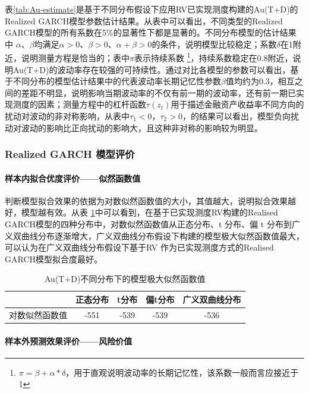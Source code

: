 \documentclass[UTF8,a4paper,12pt]{ctexart}  %
\begin{document}
表\ref{tab:Au-estimate}是基于不同分布假设下应用RV已实现测度构建的Au(T+D)的
Realized GARCH模型参数估计结果。从表中可以看出，不同类型的Realized GARCH模型的所有系数在5\%的显著性下都是显著的。不同分布模型的估计结果中
\(\alpha\)、\(\beta\)均满足\(\alpha>0\)、\(\beta>0\)、\(\alpha+\beta>0\)的条件，说明模型比较稳定；系数\(\delta\)在1附近，说明测量方程是恰当的；表中\(\pi\)表示持续系数
\footnote{\(\pi=\beta+\alpha*\delta\)，用于直观说明波动率的长期记忆性，该系数一般而言应接近于1}，持续系数稳定在0.8附近，说明Au(T+D)的波动率存在较强的可持续性。通过对比各模型的参数可以看出，基于不同分布的模型估计结果中的代表波动率长期记忆性参数\(\beta\)值均约为0.3，相互之间的差距不明显，说明影响当期波动率的不仅有前一期的波动率，还有前一期已实现测度的因素；测量方程中的杠杆函数\(\tau(z_{t})\)用于描述金融资产收益率不同方向的扰动对波动的非对称影响，从表中\(\tau_1<0\)，\(\tau_2>0\)，的结果可以看出，模型负向扰动对波动的影响比正向扰动的影响大，且这种非对称的影响较为明显。

\hypertarget{realized-garch-}{%
\subsubsection{Realized GARCH 模型评价}\label{realized-garch-}}

\hypertarget{section-17}{%
\paragraph{样本内拟合优度评价------似然函数值}\label{section-17}}

判断模型拟合效果的依据为对数似然函数值的大小，其值越大，说明拟合效果越好，模型越有效。从表
\ref{tab:AULOG}中可以看到，在基于已实现测度RV构建的Realised GARCH模型的四种分布中，对数似然函数值从正态分布、t 分布、偏 t 分布到广义双曲线分布逐渐增大，广义双曲线分布假设下构建的模型极大似然函数值最大，可以认为在广义双曲线分布假设下基于RV
作为已实现测度方式的Realised GARCH模型拟合度最好。

\begin{longtable}[t]{lcccc}
\caption{\label{tab:AULOG}Au(T+D)不同分布下的模型极大似然函数值}\\
\toprule
  & 正态分布 & t分布 & 偏t分布 & 广义双曲线分布\\
\midrule
对数似然函数值 & -551 & -539 & -539 & -536\\
\bottomrule
\end{longtable}

\hypertarget{section-18}{%
\paragraph{样本外预测效果评价------风险价值}\label{section-18}}
\end{document}
